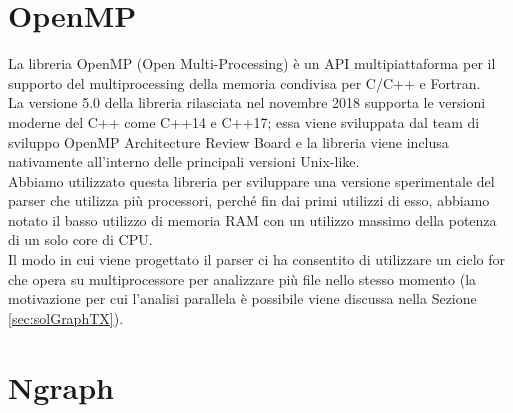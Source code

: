 \section{OpenMP} \label{sec:openmp}

La libreria OpenMP (Open Multi-Processing) \cite{dagum1998openmp} è un API multipiattaforma per il supporto del multiprocessing della memoria condivisa per C/C++ e Fortran.\\
La versione 5.0 della libreria rilasciata nel novembre 2018 supporta le versioni moderne del C++ come C++14 e C++17; essa viene sviluppata dal team di sviluppo OpenMP Architecture Review Board e la libreria viene inclusa nativamente all'interno delle principali versioni Unix-like.\\
Abbiamo utilizzato questa libreria per sviluppare una versione sperimentale del parser che utilizza più processori, perché fin dai primi utilizzi di esso, abbiamo notato il basso utilizzo di memoria RAM con un utilizzo massimo della potenza di un solo core di CPU.\\
Il modo in cui viene progettato il parser ci ha consentito di utilizzare un ciclo for che opera su multiprocessore per analizzare più file nello stesso momento (la motivazione per cui l'analisi parallela è possibile viene discussa nella Sezione \ref{sec:solGraphTX}).

\section{Ngraph} \label{sec:ngraph}

